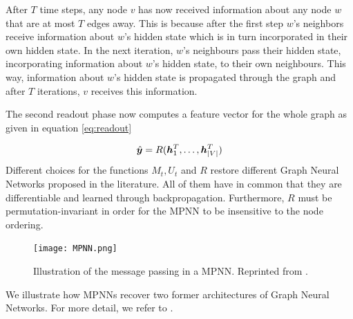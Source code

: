 After $T$ time steps, any node $v$ has now received information about any node $w$ that are at most $T$ edges away. This is because after the first step $w$'s neighbors receive information about $w$'s hidden state which is in turn incorporated in their own hidden state. In the next iteration, $w$'s neighbours pass their hidden state, incorporating information about $w$'s hidden state, to their own neighbours. This way, information about $w$'s hidden state is propagated through the graph and after $T$ iterations, $v$ receives this information.

The second readout phase now computes a feature vector for the whole graph as given in equation \ref{eq:readout}

\begin{equation}
	\hat{\boldsymbol y} = R(\boldsymbol h_1^T, \ldots, \boldsymbol h_{|V|}^T) \label{eq:readout}
\end{equation}
Different choices for the functions $M_t, U_t$ and $R$ restore different Graph Neural Networks proposed in the literature. All of them have in common that they are differentiable and learned through backpropagation. Furthermore, $R$ must be permutation-invariant in order for the MPNN to be insensitive to the node ordering.
\begin{figure}[h]
	\centering 
	\texttt{[image: MPNN.png]}
	\caption{Illustration of the message passing in a MPNN. Reprinted from \cite{mpnn_graphics}. }
	\label{fig:mpnn}
\end{figure}
We illustrate how MPNNs recover two former architectures of Graph Neural Networks. For more detail, we refer to \cite{GilmerSRVD17}.

